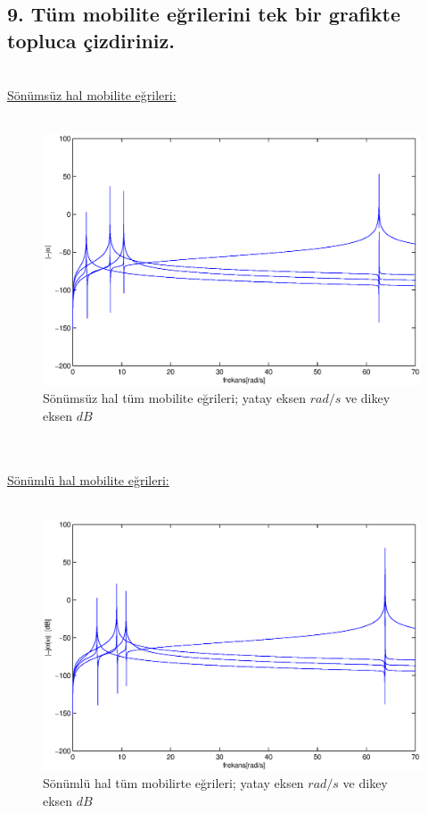 \documentclass[a4paper]{report}
\begin{document}
\subsection*{9. Tüm mobilite eğrilerini tek bir grafikte topluca çizdiriniz.}
~\\
\underline{Sönümsüz hal mobilite eğrileri:}\\
~\\
\begin{figure}[H]\shorthandoff{=}
\centerline{
{\includegraphics[width=1.3\textwidth]{./mobilite.eps}}}
\caption[Sönümsüz hal nokta FRF'ler]{Sönümsüz hal tüm mobilite eğrileri; yatay eksen ${rad}/{s}$ ve dikey eksen $dB$ }
\label{fig:noktaFRFs4-7}
\end{figure}
~\\\clearpage~\\
\underline{Sönümlü hal mobilite eğrileri:}\\
~\\
\begin{figure}[H]\shorthandoff{=}
\centerline{
{\includegraphics[width=1.3\textwidth]{./mobilites.eps}}}
\caption[Sönümsüz hal nokta FRF'ler]{Sönümlü hal tüm mobilirte eğrileri; yatay eksen ${rad}/{s}$ ve dikey eksen $dB$ }
\label{fig:noktaFRFs4-7}
\end{figure}
\end{document}
